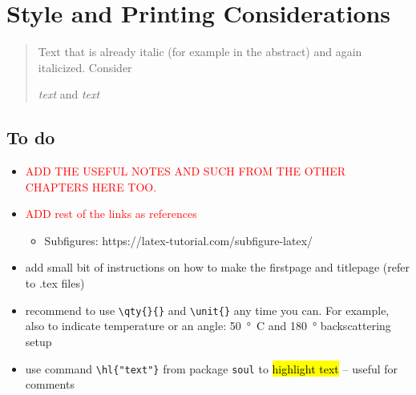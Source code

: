 \documentclass[main_brownies.tex]{subfiles}
\begin{document}
\graphicspath{ {Figures/}{Schemes/} } %
{}%

\checkoddpage
\ifoddpage
	\newpage\thispagestyle{empty}
	\mbox{}
	\newpage
\else
\fi

\chapter[Instructions]{Style and Printing Considerations} %
	
\begin{abstract}
	Text that is already italic (for example in the abstract) and again italicized. Consider 
	\begin{LTXexample}[pos=b,preset=\centering,width=0.5\linewidth]
		\textit{text} and \emph{text}
	\end{LTXexample}
\end{abstract}

\section{To do}
\begin{itemize}
	\item \textcolor{red}{ADD THE USEFUL NOTES AND SUCH FROM THE OTHER CHAPTERS HERE TOO.}
	\item \textcolor{red}{ADD rest of the links as references}
	\begin{itemize}
		\item Subfigures: https://latex-tutorial.com/subfigure-latex/
	\end{itemize}
	\item add small bit of instructions on how to make the firstpage and titlepage (refer to .tex files)
	\item recommend to use \verb*|\qty{}{}| and \verb*|\unit{}| any time you can. For example, also to indicate temperature or an angle: \qty{50}{\degree C} and \qty{180}{\degree} backscattering setup
	\item use command \verb*|\hl{"text"}| from package \verb*|soul| to \hl{highlight text} -- useful for comments
\end{itemize}
\end{document}
